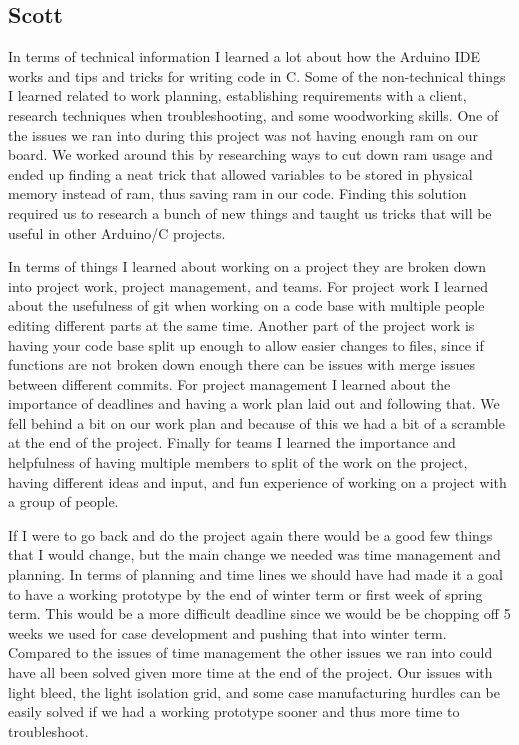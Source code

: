 \documentclass[onecolumn, draftclsnofoot,10pt, compsoc]{IEEEtran}
\begin{document}
\subsection{Scott}
In terms of technical information I learned a lot about how the Arduino IDE works and tips and tricks for writing code in C.
Some of the non-technical things I learned related to work planning, establishing requirements with a client, research techniques when troubleshooting, and some woodworking skills.
One of the issues we ran into during this project was not having enough ram on our board.
We worked around this by researching ways to cut down ram usage and ended up finding a neat trick that allowed variables to be stored in physical memory instead of ram, thus saving ram in our code.
Finding this solution required us to research a bunch of new things and taught us tricks that will be useful in other Arduino/C projects.

In terms of things I learned about working on a project they are broken down into project work, project management, and teams.
For project work I learned about the usefulness of git when working on a code base with multiple people editing different parts at the same time.
Another part of the project work is having your code base split up enough to allow easier changes to files, since if functions are not broken down enough there can be issues with merge issues between different commits.
For project management I learned about the importance of deadlines and having a work plan laid out and following that.
We fell behind a bit on our work plan and because of this we had a bit of a scramble at the end of the project.
Finally for teams I learned the importance and helpfulness of having multiple members to split of the work on the project, having different ideas and input, and fun experience of working on a project with a group of people.

If I were to go back and do the project again there would be a good few things that I would change, but the main change we needed was time management and planning.
In terms of planning and time lines we should have had made it a goal to have a working prototype by the end of winter term or first week of spring term.
This would be a more difficult deadline since we would be be chopping off 5 weeks we used for case development and pushing that into winter term.
Compared to the issues of time management the other issues we ran into could have all been solved given more time at the end of the project.
Our issues with light bleed, the light isolation grid, and some case manufacturing hurdles can be easily solved if we had a working prototype sooner and thus more time to troubleshoot.
\end{document}
